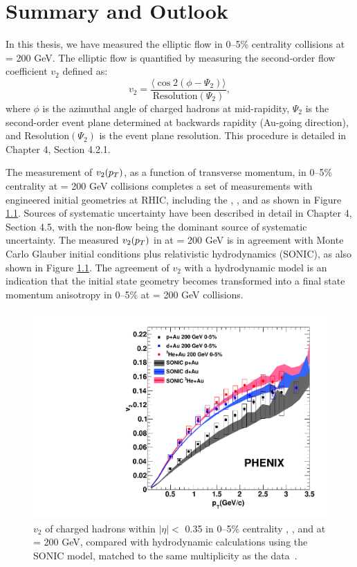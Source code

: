 \chapter{Summary and Outlook}
In this thesis, we have measured the elliptic flow in 0--5\% centrality \pau collisions at \sqsn = 200 GeV. The elliptic flow is quantified by measuring the second-order flow coefficient $v_2$ defined as:
\begin{equation}
v_2 = \frac{\langle\cos 2(\phi-\Psi_2) \rangle}{ \textrm{Resolution}(\Psi_2)},
\end{equation}
where $\phi$ is the azimuthal angle of charged hadrons at mid-rapidity, $\Psi_2$ is the second-order event plane determined at backwards rapidity (Au-going direction), and Resolution$(\Psi_2)$ is the event plane resolution. This procedure is detailed in Chapter 4, Section 4.2.1.

The measurement of $v_2(\mbox{$p_T$})$, as a function of transverse momentum, in 0--5\% centrality \pau at \sqsn = 200 GeV collisions completes a set of measurements with engineered initial geometries at RHIC, including the \pau, \dau, and \hau as shown in Figure \ref{fig:all_system_hydro_6}. Sources of systematic uncertainty have been described in detail in Chapter 4, Section 4.5, with the non-flow being the dominant source of systematic uncertainty. The measured $v_2(\mbox{$p_T$})$ in \pau at \sqsn = 200 GeV is in agreement with Monte Carlo Glauber initial conditions plus relativistic hydrodynamics (SONIC), as also shown in Figure \ref{fig:all_system_hydro_6}. The agreement of $v_2$ with a hydrodynamic model is an indication that the initial state geometry becomes transformed into a final state momentum anisotropy in 0--5\% \pau at \sqsn = 200 GeV collisions. 

\begin{figure}[!ht]
\begin{center}
\includegraphics[width=0.5\linewidth]{figs/three_system_comparison_result.pdf}
\caption{$v_2$ of charged hadrons within $|\eta| <$ 0.35 in 0--5\% centrality \pau, \dau, and \hau at \sqsn = 200 GeV, compared with hydrodynamic calculations using the SONIC model, matched to the same multiplicity as the data~\cite{Habich:2014jna}.}
\label{fig:all_system_hydro_6}
\end{center}
\end{figure}

